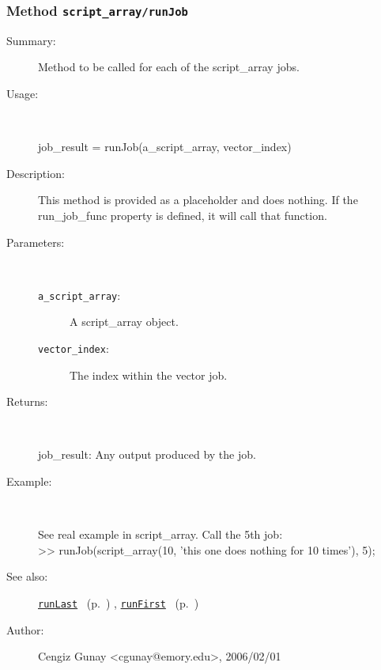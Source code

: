 \subsubsection[Method \texttt{runJob}]{Method \texttt{script\_array/runJob}}%
%
\label{ref_script_array__runJob}%
\hypertarget{ref_script_array__runJob}{}%
\begin{description}
\item[Summary:]Method to be called for each of the script\_array jobs.
%
\item[Usage:]~%
\begin{lyxcode}%
job\_result = runJob(a\_script\_array, vector\_index)
%
\end{lyxcode}%
%
\item[Description:]%
This method is provided as a placeholder and does nothing. If the run\_job\_func
 property is defined, it will call that function.
\item[Parameters:]~
\begin{description}%
\item[\texttt{a\_script\_array}:]
 A script\_array object.
\item[\texttt{vector\_index}:]
 The index within the vector job.
\end{description}%
%
\item[Returns:
]~

   job\_result: Any output produced by the job.
%
\item[Example:]~
\begin{lyxcode} See real example in script\_array. Call the 5th job:
\\%
 >> runJob(script\_array(10, 'this one does nothing for 10 times'), 5);
\\%
\end{lyxcode}
%
\item[See also:]%
\hyperlink{ref_runLast}{\texttt{runLast}}%
\ (p.~\pageref{ref_runLast})%
%
, \hyperlink{ref_runFirst}{\texttt{runFirst}}%
\ (p.~\pageref{ref_runFirst})%
%
%
\item[Author:]%
Cengiz Gunay <cgunay@emory.edu>, 2006/02/01
%
\end{description}
\methodline%
